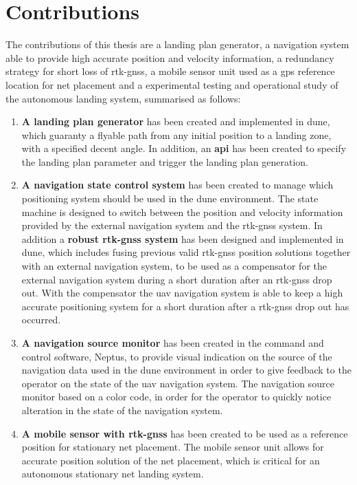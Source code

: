 \section{Contributions}
The contributions of this thesis are a landing plan generator, a navigation system able to provide high accurate position and velocity information, a redundancy strategy for short loss of \gls{rtk-gnss}, a mobile sensor unit used as a \gls{gps} reference location for net placement and a experimental testing and operational study of the autonomous landing system, summarised as follows:
\begin{enumerate}
\item \textbf{A landing plan generator} has been created and implemented in \gls{dune}, which guaranty a flyable path from any initial position to a landing zone, with a specified decent angle. In addition, an \textbf{\acrfull{api}} has been created to specify the landing plan parameter and trigger the landing plan generation.
\item \textbf{A navigation state control system} has been created to manage which positioning system should be used in the \gls{dune} environment. The state machine is designed to switch between the position and velocity information provided by the external navigation system and the \gls{rtk-gnss} system. In addition a \textbf{robust \gls{rtk-gnss} system} has been designed and implemented in \gls{dune}, which includes fusing previous valid \gls{rtk-gnss} position solutions together with an external navigation system, to be used as a compensator for the external navigation system during a short duration after an \gls{rtk-gnss} drop out. With the compensator the \gls{uav} navigation system is able to keep a high accurate positioning system for a short duration after a \gls{rtk-gnss} drop out has occurred.
\item \textbf{A navigation source monitor} has been created in the command and control software, Neptus, to provide visual indication on the source of the navigation data used in the \gls{dune} environment in order to give feedback to the operator on the state of the \gls{uav} navigation system. The navigation source monitor based on a color code, in order for the operator to quickly notice alteration in the state of the navigation system.
\item \textbf{A mobile sensor with \gls{rtk-gnss}} has been created to be used as a reference position for stationary net placement. The mobile sensor unit allows for accurate position solution of the net placement, which is critical for an autonomous stationary net landing system.

\end{enumerate}
